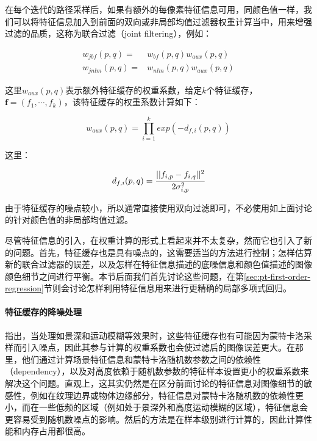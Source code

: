在每个迭代的路径采样后，如果有额外的每像素特征信息可用，同颜色值一样，我们可以将特征信息加入到前面的双向或非局部均值过滤器权重计算当中，用来增强过滤的品质，这称为联合过滤（joint filtering），例如：

\begin{equation}
	\begin{aligned}
		w_{jbf}(p,q)=&w_{bf}(p,q)w_{aux}(p,q)\\
		w_{jnlm}(p,q)=&w_{nlm}(p,q)w_{aux}(p,q)
	\end{aligned}
\end{equation}

\noindent 这里$w_{aux}(p,q)$表示额外特征缓存的权重系数，给定$k$个特征缓存，$\mathbf{f}=(f_1,\cdots,f_k)$，该特征缓存的权重系数计算如下：

\begin{equation}
	w_{aux}(p,q)=\prod^{k}_{i=1}exp(-d_{f,i}(p,q))
\end{equation}

\noindent 这里：

\begin{equation}\label{e:pt-feature-distance}
	d_{f,i}(p,q)= \cfrac{||f_{i,p}-f_{i,q}||^{2}}{2\sigma^{2}_{i,p}}
\end{equation}

\noindent 由于特征缓存的噪点较小，所以通常直接使用双向过滤即可，不必使用如上面讨论的针对颜色值的非局部均值过滤。

尽管特征信息的引入，在权重计算的形式上看起来并不太复杂，然而它也引入了新的问题。首先，特征缓存也是具有噪点的，这需要适当的方法进行控制；怎样估算新的联合过滤器的误差，以及怎样在特征信息描述的底噪信息和颜色值描述的图像颜色细节之间进行平衡。本节后面我们首先讨论这些问题，在第\ref{sec:pt-first-order-regression}节则会讨论怎样利用特征信息用来进行更精确的局部多项式回归。







\paragraph{特征缓存的降噪处理}
\cite{a:OnFilteringtheNoisefromtheRandomParametersinMonteCarloRendering}指出，当处理如景深和运动模糊等效果时，这些特征缓存也有可能因为蒙特卡洛采样而引入噪点，因此其参与计算的权重系数也会使过滤后的图像误差更大。在那里，他们通过计算场景特征信息和蒙特卡洛随机数参数之间的依赖性（dependency），以及对高度依赖于随机数参数的特征样本设置更小的权重系数来解决这个问题。直观上，这其实仍然是在区分前面讨论的特征信息对图像细节的敏感性，例如在纹理边界或物体边缘部分，特征信息对蒙特卡洛随机数的依赖性更小，而在一些低频的区域（例如处于景深外和高度运动模糊的区域），特征信息会更容易受到随机数噪点的影响。然后\cite{a:OnFilteringtheNoisefromtheRandomParametersinMonteCarloRendering}的方法是在样本级别进行计算的，因此计算性能和内存占用都很高。

